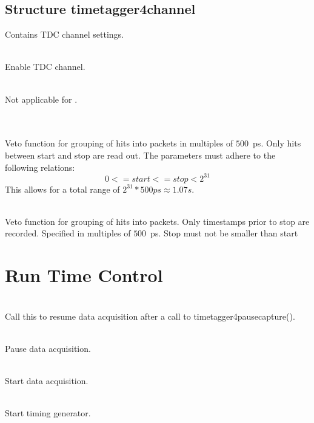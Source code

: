 		\subsection{Structure timetagger4\tu channel}
			Contains TDC channel settings.\par

			\\
			Enable TDC channel.\par

			\\
			Not applicable for \deviceName.

			\\
			\\
			Veto function for grouping of hits into packets in multiples of $500$~ps. Only hits between start and stop are read out.
			The parameters must adhere to the following relations:
			\[
				0 <= start <= stop < 2^{31}
			\]
			This allows for a total range of \(2^{31}*500ps \approx 1.07s\). 

			\\
			Veto function for grouping of hits into packets. 
			Only timestamps prior to \textsf{stop} are recorded.  
			Specified in multiples of $500$~ps.
			\textsf{Stop} must not be smaller than \textsf{start}

	\section{Run Time Control}

			\\
			Call this to resume data acquisition after a call to \textsf{timetagger4\tu pause\tu capture()}.\par

			\\
			Pause data acquisition.\par

			\\
			Start data acquisition.\par

			\\
			Start timing generator.\par

